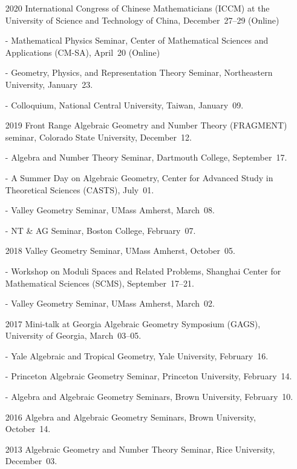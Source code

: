 \documentclass[12pt]{article}
\begin{document}
\begin{itemize}[leftmargin=!, itemsep=0pt]
	\item[2020] International Congress of Chinese Mathematicians (ICCM) at the University of Science and Technology of China, December~27--29 (Online)
	\item[-] Mathematical Physics Seminar, Center of Mathematical Sciences and Applications (CM-SA), April~20 (Online)
	\item[-] Geometry, Physics, and Representation Theory Seminar, Northeastern University, January~23.
	\item[-] Colloquium, National Central University, Taiwan, January~09.
	\item[2019] Front Range Algebraic Geometry and Number Theory (FRAGMENT) seminar, Colorado State University, December~12.
	\item[-] Algebra and Number Theory Seminar, Dartmouth College, September~17.
	\item[-] A Summer Day on Algebraic Geometry, Center for Advanced Study in Theoretical Sciences (CASTS), July~01.
	\item[-] Valley Geometry Seminar, UMass Amherst, March~08.
	\item[-] NT \& AG Seminar, Boston College, February~07.
	\item[2018] Valley Geometry Seminar, UMass Amherst, October~05.
	\item[-] Workshop on Moduli Spaces and Related Problems, Shanghai Center for Mathematical Sciences (SCMS), September~17--21.
	\item[-] Valley Geometry Seminar, UMass Amherst, March~02.
	\item[2017] Mini-talk at Georgia Algebraic Geometry Symposium (GAGS), University of Georgia, March~03--05.
	\item[-] Yale Algebraic and Tropical Geometry, Yale University, February~16.
	\item[-] Princeton Algebraic Geometry Seminar, Princeton University, February~14.
	\item[-] Algebra and Algebraic Geometry Seminars, Brown University, February~10.
	\item[2016] Algebra and Algebraic Geometry Seminars, Brown University, October~14.
	\item[2013] Algebraic Geometry and Number Theory Seminar, Rice University, December~03.
\end{itemize}


\end{document}
